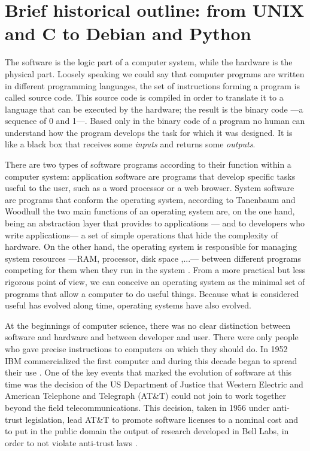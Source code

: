 \chapter{Brief historical outline: from UNIX and C to Debian and Python}

The software is the logic part of a computer system, while the hardware is the physical part. Loosely speaking we could say that computer programs are written in different programming languages, the set of instructions forming a program is called source code. This source code is compiled in order to translate it to a language that can be executed by the hardware; the result is the binary code ---a sequence of 0 and 1---. Based only in the binary code of a program no human can understand how the program develops the task for which it was designed. It is like a black box that receives some \emph{inputs} and returns some \emph{outputs}.

There are two types of software programs according to their function within a computer system: application software are programs that develop specific tasks useful to the user, such as a word processor or a web browser. System software are programs that conform the operating system, according to Tanenbaum and Woodhull the two main functions of an operating system are, on the one hand, being an abstraction layer that provides to applications --- and to developers who write applications--- a set of simple operations that hide the complexity of hardware. On the other hand, the operating system is responsible for managing system resources ---RAM, processor, disk space ,...--- between different programs competing for them when they run in the system \citep[3-5]{tanenbaum:1996}. From a more practical but less rigorous point of view, we can conceive an operating system as the minimal set of programs that allow a computer to do useful things. Because what is considered useful has evolved along time, operating systems have also evolved.

At the beginnings of computer science, there was no clear distinction between software and hardware and between developer and user. There were only people who gave precise instructions to computers on which they should do. In 1952 IBM commercialized the first computer and during this decade began to spread their use \citep[21]{weber:2004}. One of the key events that marked the evolution of software at this time was the decision of the US Department of Justice that Western Electric and American Telephone and Telegraph (AT\&T) could not join to work together beyond the field telecommunications. This decision, taken in 1956 under anti-trust legislation, lead AT\&T to promote software licenses to a nominal cost and to put in the public domain the output of research developed in Bell Labs, in order to not violate anti-trust laws \citep[20]{roca:2007}.

